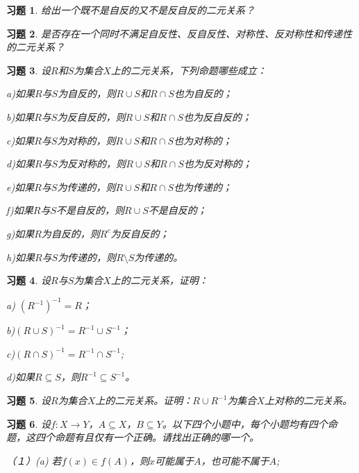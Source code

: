\documentclass{article}
\begin{document}
\begin{CJK}{UTF8}{gbsn}
\newtheorem{Exercise}{习题}
\begin{Exercise}
给出一个既不是自反的又不是反自反的二元关系？
\end{Exercise}
\vspace{3cm}
\begin{Exercise}
是否存在一个同时不满足自反性、反自反性、对称性、反对称性和传递性的二元关系？
\end{Exercise}
\vspace{3cm}
\begin{Exercise}
设$R$和$S$为集合$X$上的二元关系，下列命题哪些成立：

a)如果$R$与$S$为自反的，则$R\cup S$和$R\cap S$也为自反的；

b)如果$R$与$S$为反自反的，则$R\cup S$和$R\cap S$也为反自反的；

c)如果$R$与$S$为对称的，则$R\cup S$和$R\cap S$也为对称的；

d)如果$R$与$S$为反对称的，则$R\cup S$和$R\cap S$也为反对称的；

e)如果$R$与$S$为传递的，则$R\cup S$和$R\cap S$也为传递的；

f)如果$R$与$S$不是自反的，则$R\cup S$不是自反的；

g)如果$R$为自反的，则$R^c$为反自反的；

h)如果$R$与$S$为传递的，则$R\setminus S$为传递的。
\end{Exercise}
\vspace{2cm}
\begin{Exercise}
  设$R$与$S$为集合$X$上的二元关系，证明：

  a) $(R^{-1})^{-1}=R$；

  b)$(R\cup S)^{-1}=R^{-1}\cup S^{-1}$；

  c)$(R\cap S)^{-1}=R^{-1}\cap S^{-1}$;

  d)如果$R\subseteq S$，则$R^{-1}\subseteq S^{-1}$。
\end{Exercise}
\vspace{10cm}
\begin{Exercise}
  设$R$为集合$X$上的二元关系。证明：$R\cup R^{-1}$为集合$X$上对称的二元关系。
\end{Exercise}
\vspace{10cm}
\begin{Exercise}
  设$f:X\to Y$，$A\subseteq X$，$B\subseteq Y$。以下四个小题中，每个小题均有四个命题，这四个命题有且仅有一个正确。请找出正确的哪一个。

  （１）(a) 若$f(x)\in f(A)$，则$x$可能属于$A$，也可能不属于$A$;


\end{Exercise}
\end{CJK}
\end{document}
